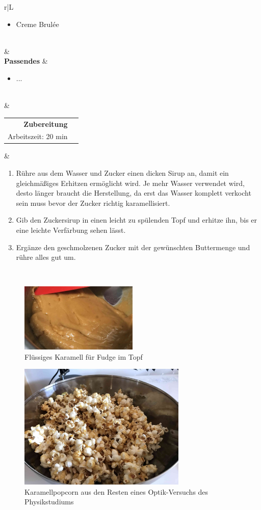 \documentclass[a4paper, 12pt]{scrbook} 								%
\numberwithin{equation}{section} 									%
\begin{document}
\begin{tabularx}{\textwidth}{r|L}
\begin{itemize}[]
										\item Creme Brulée
									\end{itemize}	\\
								&	\\	
		\textbf{Passendes}		&	\begin{itemize}[]
										\item ...
									\end{itemize}	\\
								&	\\	
		\begin{tabular}[t]{rr}
			\textbf{Zubereitung}	\\
			Arbeitszeit: 20 min	\\
		\end{tabular}			&	\begin{enumerate}[]
										\item Rühre aus dem Wasser und Zucker einen dicken Sirup an, damit ein gleichmäßiges Erhitzen ermöglicht wird. Je mehr Wasser verwendet wird, desto länger braucht die Herstellung, da erst das Wasser komplett verkocht sein muss bevor der Zucker richtig karamellisiert. 
										\item Gib den Zuckersirup in einen leicht zu spülenden Topf und erhitze ihn, bis er eine leichte Verfärbung sehen lässt.
										\item Ergänze den geschmolzenen Zucker mit der gewünschten Buttermenge und rühre alles gut um.
									\end{enumerate}	\\
	\end{tabularx}


	\begin{figure}[h]
		\centering
		\includegraphics[width = 0.5\textwidth]{media/karamell_fudge.JPG}
		\caption{Flüssiges Karamell für Fudge im Topf}
	\end{figure}

	\begin{figure}[h]
		\centering
		\includegraphics[height = 6cm]{media/popcorn.jpg}
		\caption{Karamellpopcorn aus den Resten eines Optik-Versuchs des Physikstudiums}
	\end{figure}
\end{document}
